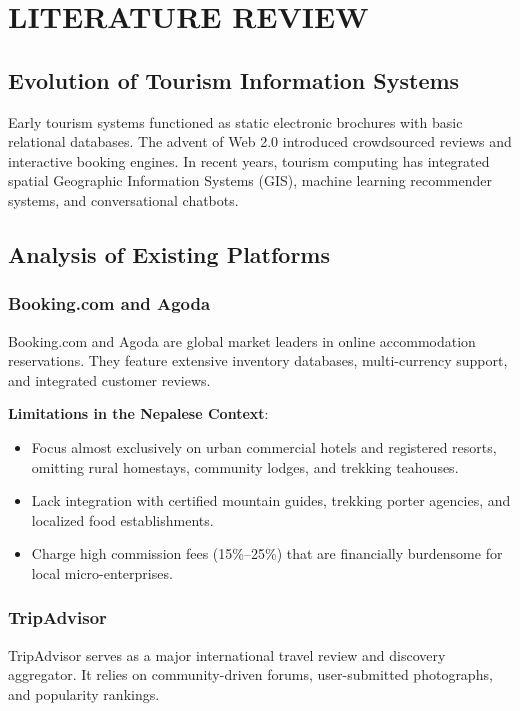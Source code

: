 \documentclass[12pt,a4paper]{report}
\begin{document}
\chapter{LITERATURE REVIEW}

\section{Evolution of Tourism Information Systems}
Early tourism systems functioned as static electronic brochures with basic relational databases. The advent of Web 2.0 introduced crowdsourced reviews and interactive booking engines. In recent years, tourism computing has integrated spatial Geographic Information Systems (GIS), machine learning recommender systems, and conversational chatbots.

\section{Analysis of Existing Platforms}

\subsection{Booking.com and Agoda}
Booking.com and Agoda are global market leaders in online accommodation reservations. They feature extensive inventory databases, multi-currency support, and integrated customer reviews. 

\textbf{Limitations in the Nepalese Context}:
\begin{itemize}
    \item Focus almost exclusively on urban commercial hotels and registered resorts, omitting rural homestays, community lodges, and trekking teahouses.
    \item Lack integration with certified mountain guides, trekking porter agencies, and localized food establishments.
    \item Charge high commission fees (15\%--25\%) that are financially burdensome for local micro-enterprises.
\end{itemize}

\subsection{TripAdvisor}
TripAdvisor serves as a major international travel review and discovery aggregator. It relies on community-driven forums, user-submitted photographs, and popularity rankings.
\end{document}
